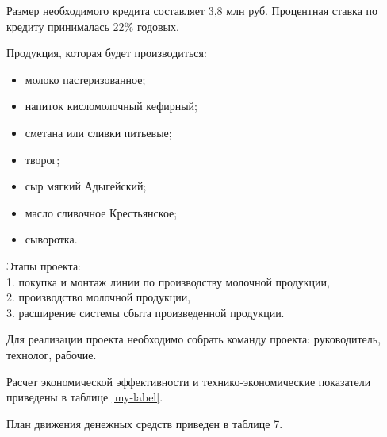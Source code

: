 Размер необходимого кредита составляет 3,8 млн руб. Процентная ставка по кредиту принималась 22\% годовых.


Продукция, которая будет производиться:
\begin{itemize}
	\item молоко пастеризованное; 
	\item напиток кисломолочный кефирный; 
	\item сметана или сливки питьевые; 
	\item творог; 
	\item сыр мягкий Адыгейский; 
	\item масло сливочное Крестьянское; 
	\item сыворотка.
\end{itemize} 

Этапы проекта:\\
1.	покупка и монтаж линии по производству молочной продукции, \\
2.	производство молочной продукции, \\
3.	расширение системы сбыта произведенной продукции. 

Для реализации проекта необходимо собрать команду проекта: руководитель, технолог, рабочие.

Расчет экономической эффективности и технико-экономические показатели приведены в таблице \ref{my-label}.

План движения денежных средств приведен в таблице 7.

